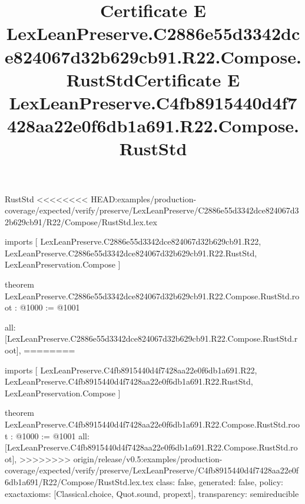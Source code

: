\begin{lexlean}{RustStd}
<<<<<<<< HEAD:examples/production-coverage/expected/verify/preserve/LexLeanPreserve/C2886e55d3342dce824067d32b629cb91/R22/Compose/RustStd.lex.tex
\title{Certificate E LexLeanPreserve.C2886e55d3342dce824067d32b629cb91.R22.Compose.RustStd}
\begin{coremodule}
imports [
  LexLeanPreserve.C2886e55d3342dce824067d32b629cb91.R22,
  LexLeanPreserve.C2886e55d3342dce824067d32b629cb91.R22.RustStd,
  LexLeanPreservation.Compose
]

theorem LexLeanPreserve.C2886e55d3342dce824067d32b629cb91.R22.Compose.RustStd.root : @1000 := @1001 {
  all: [LexLeanPreserve.C2886e55d3342dce824067d32b629cb91.R22.Compose.RustStd.root],
========
\title{Certificate E LexLeanPreserve.C4fb8915440d4f7428aa22e0f6db1a691.R22.Compose.RustStd}
\begin{coremodule}
imports [
  LexLeanPreserve.C4fb8915440d4f7428aa22e0f6db1a691.R22,
  LexLeanPreserve.C4fb8915440d4f7428aa22e0f6db1a691.R22.RustStd,
  LexLeanPreservation.Compose
]

theorem LexLeanPreserve.C4fb8915440d4f7428aa22e0f6db1a691.R22.Compose.RustStd.root : @1000 := @1001 {
  all: [LexLeanPreserve.C4fb8915440d4f7428aa22e0f6db1a691.R22.Compose.RustStd.root],
>>>>>>>> origin/release/v0.5:examples/production-coverage/expected/verify/preserve/LexLeanPreserve/C4fb8915440d4f7428aa22e0f6db1a691/R22/Compose/RustStd.lex.tex
  class: false,
  generated: false,
  policy: exact{axioms: [Classical.choice, Quot.sound, propext]},
  transparency: semireducible
}


\end{coremodule}}
\end{coremodule}
\end{lexlean}
